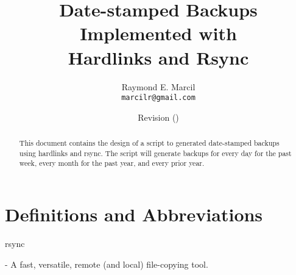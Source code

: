 \documentclass[12pt,letterpaper,dvips]{article}
\title{Date-stamped Backups\\
       Implemented with\\
       Hardlinks and Rsync}
\author{Raymond E. Marcil\\
        \texttt{marcilr@gmail.com}
}
\date{Revision \svnInfoRevision
      \hspace{2pt}
      (\svnInfoLongDate)}
\newenvironment{itemize*}%
  {\begin{itemize}%
    \setlength{\itemsep}{0pt}%
    \setlength{\parsep}{0pt}}%
  {\end{itemize}}
\begin{document}
\maketitle

\begin{abstract}
  This document contains the design of a script to generated date-stamped backups using hardlinks
  and rsync.  The script will generate backups for every day for the
  past week, every month for the past year, and every prior year.

\end{abstract}

\vspace{2.0in}



\newpage


\tableofcontents

\newpage
\listoffigures
\listoftables


\newpage

\section*{Definitions and Abbreviations}
\begin{itemize*}
  \item{\begin{bf}rsync\end{bf}} - A fast, versatile, remote (and local) file-copying tool.
\end{itemize*}
\end{document}
